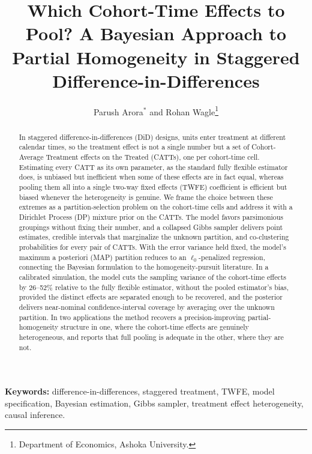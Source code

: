 \documentclass[margin=5in, 12pt]{article}
\title{\textbf{Which Cohort-Time Effects to Pool? A Bayesian Approach to
       Partial Homogeneity in Staggered Difference-in-Differences}%
       }
\author{Parush Arora$^*$ and Rohan Wagle\thanks{Department of Economics, Ashoka University.}}
\date{}
\newcommand{\1}{\mathbbm{1}}
\begin{document}
\maketitle

\begin{abstract}
  \noindent
  In staggered difference-in-differences (DiD) designs, units enter treatment at
  different calendar times, so the treatment effect is not a single number but a
  set of Cohort-Average Treatment effects on the Treated (CATTs), one per
  cohort-time cell. Estimating every CATT as its own parameter, as the standard
  fully flexible estimator does, is unbiased but inefficient when some of these
  effects are in fact equal, whereas pooling them all into a single two-way fixed effects
  (TWFE) coefficient is efficient but biased whenever the heterogeneity is genuine.
  We frame the choice between these extremes as a partition-selection
  problem on the cohort-time cells and address it with a Dirichlet
  Process (DP) mixture prior on the CATTs. The model favors parsimonious groupings
  without fixing their number, and a collapsed Gibbs sampler delivers point
  estimates, credible intervals that marginalize the unknown partition, and
  co-clustering probabilities for every pair of CATTs. With the error variance
  held fixed, the model's maximum a posteriori (MAP) partition reduces to an
  $\ell_0$-penalized regression, connecting the Bayesian formulation to the
  homogeneity-pursuit literature.
  In a calibrated simulation, the model cuts the sampling variance of the
  cohort-time effects by 26--52\% relative to the fully flexible estimator, without
  the pooled estimator's bias, provided the distinct effects are separated enough
  to be recovered, and the posterior delivers near-nominal confidence-interval
  coverage by averaging over the unknown partition.
  In two applications the method recovers a precision-improving
  partial-homogeneity structure in one, where the cohort-time effects are
  genuinely heterogeneous, and reports that full pooling is adequate in the
  other, where they are not.
\end{abstract}

\bigskip
\noindent\textbf{Keywords:} difference-in-differences, staggered treatment, TWFE, model specification, Bayesian estimation, Gibbs sampler,
treatment effect heterogeneity, causal inference.
\end{document}
